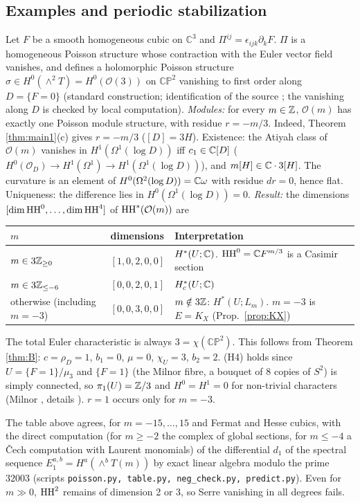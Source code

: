 \subsection{Examples and periodic stabilization}
\begin{ex}\tP \tV\label{ex:cp2}
Let $F$ be a smooth homogeneous cubic on $\mathbb C^3$ and $\Pi^{ij}=\epsilon_{ijk}\partial_kF$. $\Pi$ is a homogeneous Poisson structure whose contraction with the Euler vector field vanishes, and defines a holomorphic Poisson structure $\sigma\in H^0(\wedge^2T)=H^0(\mathcal O(3))$ on $\mathbb{CP}^2$ vanishing to first order along $D=\{F=0\}$ (standard construction; identification of the source \tQ; the vanishing along $D$ is checked by local computation).
\emph{Modules:} for every $m\in\mathbb Z$, $\mathcal O(m)$ has exactly one Poisson module structure, with residue $r=-m/3$. Indeed, Theorem \ref{thm:main1}(c) gives $r=-m/3$ ($[D]=3H$). Existence: the Atiyah class of $\mathcal O(m)$ vanishes in $H^1(\Omega^1(\log D))$ iff $c_1\in\mathbb C[D]$ ($H^0(\mathcal O_D)\to H^1(\Omega^1)\to H^1(\Omega^1(\log D))$), and $m[H]\in\mathbb C\cdot3[H]$. The curvature is an element of $H^0(\Omega^2(\log D))=\mathbb C\omega$ with residue $dr=0$, hence flat. Uniqueness: the difference lies in $H^0(\Omega^1(\log D))=0$.
\emph{Result:} the dimensions $[\dim\mathrm{HH}^0,\dots,\dim\mathrm{HH}^4]$ of $\mathrm{HH}^*(\mathcal O(m))$ are
\begin{center}\small
\begin{tabular}{lll}\toprule
$m$ & dimensions & Interpretation\\\midrule
$m\in3\mathbb Z_{\ge0}$ & $[1,0,2,0,0]$ & $H^*(U;\mathbb C)$. $\mathrm{HH}^0=\mathbb C F^{m/3}$ is a Casimir section\\
$m\in3\mathbb Z_{\le-6}$ & $[0,0,2,0,1]$ & $H^*_c(U;\mathbb C)$\\
otherwise (including $m=-3$) & $[0,0,3,0,0]$ & $m\notin3\mathbb Z$: $H^*(U;L_m)$. $m=-3$ is $E=K_X$ (Prop.\ \ref{prop:KX})\\\bottomrule
\end{tabular}
\end{center}
The total Euler characteristic is always $3=\chi(\mathbb{CP}^2)$. This follows from Theorem \ref{thm:B}: $c=\rho_D=1$, $b_1=0$, $\mu=0$, $\chi_U=3$, $b_2=2$. (H4) holds since $U=\{F=1\}/\mu_3$ and $\{F=1\}$ (the Milnor fibre, a bouquet of 8 copies of $S^2$) is simply connected, so $\pi_1(U)=\mathbb Z/3$ and $H^0=H^1=0$ for non-trivial characters (\tC Milnor \cite{Milnor}, details \tQ). $r=1$ occurs only for $m=-3$.
\end{ex}
\tV The table above agrees, for $m=-15,\dots,15$ and Fermat and Hesse cubics, with the direct computation (for $m\ge-2$ the complex of global sections, for $m\le-4$ a \v Cech computation with Laurent monomials) of the differential $d_1$ of the spectral sequence $E_1^{a,b}=H^a(\wedge^bT(m))$ by exact linear algebra modulo the prime $32003$ (scripts \texttt{poisson.py, table.py, neg\_check.py, predict.py}). Even for $m\gg0$, $\mathrm{HH}^2$ remains of dimension 2 or 3, so Serre vanishing in all degrees fails.

